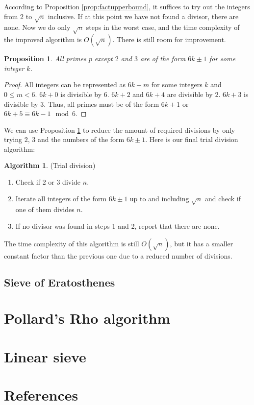 \documentclass[12pt] {article}
\theoremstyle{plain}
\newtheorem{prop}[thm]{Proposition}
\theoremstyle{definition}
\newtheorem{algo}[thm]{Algorithm}
\begin{document}
According to Proposition \ref{prop:factupperbound}, it suffices to try out the integers from $2$ to $\sqrt{n}$ inclusive. If at this point we have not found a divisor, there are none. Now we do only $\sqrt{n}$ steps in the worst case, and the time complexity of the improved algorithm is $O(\sqrt{n})$. There is still room for improvement.

\begin{prop}
\label {prop:primes6pm1}
All primes $p$ except $2$ and $3$ are of the form $6k \pm 1$ for some integer $k$.
\end{prop}

\begin{proof}
All integers can be represented as $6k + m$ for some integers $k$ and $0 \leq m < 6$. $6k + 0$ is divisible by 6. $6k + 2$ and $6k + 4$ are divisible by 2. $6k + 3$ is divisible by 3. Thus, all primes must be of the form $6k + 1$ or $6k + 5 \equiv 6k - 1 \mod 6$.
\end{proof}

We can use Proposition \ref{prop:primes6pm1} to reduce the amount of required divisions by only trying $2$, $3$ and the numbers of the form $6k \pm 1$. Here is our final trial division algorithm:
\begin{algo} (Trial division)
\begin{enumerate}
\item Check if $2$ or $3$ divide $n$.
\item Iterate all integers of the form $6k \pm 1$ up to and including $\sqrt{n}$ and check if one of them divides $n$.
\item If no divisor was found in steps 1 and 2, report that there are none.
\end{enumerate}
\end{algo}

The time complexity of this algorithm is still $O(\sqrt{n})$, but it has a smaller constant factor than the previous one due to a reduced number of divisions.

\subsection {Sieve of Eratosthenes}

\section {Pollard's Rho algorithm}

\section {Linear sieve}

\section {References}
\end{document}
